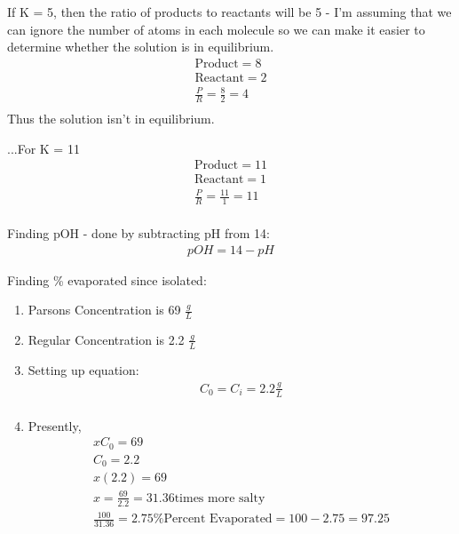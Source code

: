 \documentclass{article}  %
\begin{document}
If K = 5, then the ratio of products to reactants will be 5 - I'm assuming that we can ignore the number of atoms in each molecule so we can make it easier to determine whether the solution is in equilibrium.
\begin{equation*}
    \begin{aligned}
        \text{Product} = 8 \\
        \text{Reactant} = 2 \\
        \frac{P}{R} = \frac{8}{2} = 4 \\
    \end{aligned}
\end{equation*}
Thus the solution isn't in equilibrium.

...For K = 11
\begin{equation*}
    \begin{aligned}
        \text{Product} = 11 \\
        \text{Reactant} = 1 \\
        \frac{P}{R} = \frac{11}{1} = 11 \\
    \end{aligned}
\end{equation*}

Finding pOH - done by subtracting pH from 14:
\begin{equation*}
    \begin{aligned}
        pOH = 14 - pH
    \end{aligned}
\end{equation*} 

Finding \% evaporated since isolated:
\begin{enumerate}
    \item Parsons Concentration is 69 $\frac{g}{L}$
    \item Regular Concentration is 2.2 $\frac{g}{L}$
    \item Setting up equation:
    \begin{equation*}
        \begin{aligned}
            C_0 = C_i = 2.2 \frac{g}{L} \\
        \end{aligned}
    \end{equation*}
    \item Presently, 
    \begin{equation*}
        \begin{aligned}
            xC_0 = 69 \\
            C_0 = 2.2 \\
            x(2.2) = 69 \\
            x = \frac{69}{2.2}  = 31.36 \text{times more salty}\\
            \frac{100}{31.36} = 2.75\% 
            \text{Percent Evaporated} = 100 - 2.75 = 97.25
        \end{aligned}
    \end{equation*}
\end{enumerate}
\end{document}
